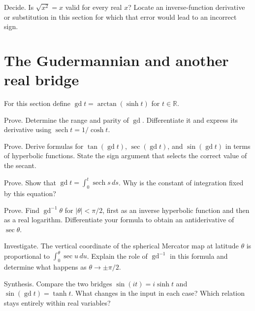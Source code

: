 \documentclass{workbook}
\DeclareMathOperator{\sech}{sech}
\DeclareMathOperator{\gd}{gd}
\newcommand{\R}{\mathbb{R}}
\begin{document}
\begin{problem}{Decide.}
Is $\sqrt{x^2}=x$ valid for every real $x$? Locate an inverse-function
derivative or substitution in this section for which that error would
lead to an incorrect sign.
\end{problem}

\section{The Gudermannian and another real bridge}

\medskip\noindent
For this section define $\gd t=\arctan(\sinh t)$ for $t\in\R$.

\begin{problem}{Prove.}
Determine the range and parity of $\gd$. Differentiate it and express
its derivative using $\sech t=1/\cosh t$.
\end{problem}

\begin{problem}{Prove.}
Derive formulas for $\tan(\gd t)$, $\sec(\gd t)$, and
$\sin(\gd t)$ in terms of hyperbolic functions. State the sign
argument that selects the correct value of the secant.
\end{problem}

\begin{problem}{Prove.}
Show that $\gd t=\int_0^t\sech s\,ds$.
Why is the constant of integration fixed by this equation?
\end{problem}

\begin{problem}{Prove.}
Find $\gd^{-1}\theta$ for $|\theta|<\pi/2$, first as an inverse
hyperbolic function and then as a real logarithm. Differentiate
your formula to obtain an antiderivative of $\sec\theta$.
\end{problem}

\begin{problem}{Investigate.}
The vertical coordinate of the spherical Mercator map at latitude
$\theta$ is proportional to $\int_0^\theta\sec u\,du$.
Explain the role of $\gd^{-1}$ in this formula and determine what
happens as $\theta\to\pm\pi/2$.
\end{problem}

\begin{problem}{Synthesis.}
Compare the two bridges $\sin(it)=i\sinh t$ and
$\sin(\gd t)=\tanh t$. What changes in the input in each case?
Which relation stays entirely within real variables?
\end{problem}
\end{document}

